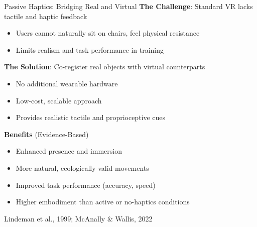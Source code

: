 \documentclass[aspectratio=169, 12pt]{beamer}
\newcommand{\citefooter}[1]{\hfill{\tiny #1}}
\begin{document}
\begin{frame}{Passive Haptics: Bridging Real and Virtual}
	\textbf{\textcolor{gbAqua}{The Challenge}}: Standard VR lacks tactile and haptic feedback
	
	\begin{itemize}
		\item Users cannot naturally sit on chairs, feel physical resistance
		\item Limits realism and task performance in training
	\end{itemize}
	
	\vspace{0.3cm}
	
	\textbf{\textcolor{gbAqua}{The Solution}}: Co-register real objects with virtual counterparts
	
	\begin{itemize}
		\item No additional wearable hardware
		\item Low-cost, scalable approach
		\item Provides realistic tactile and proprioceptive cues
	\end{itemize}
	
	\vspace{0.3cm}
	
	\textbf{\textcolor{gbAqua}{Benefits}} (Evidence-Based)
	
	\begin{itemize}
		\item Enhanced presence and immersion
		\item More natural, ecologically valid movements
		\item Improved task performance (accuracy, speed)
		\item Higher embodiment than active or no-haptics conditions
	\end{itemize}
	
	\citefooter{Lindeman et al., 1999; McAnally \& Wallis, 2022}
\end{frame}
\end{document}
